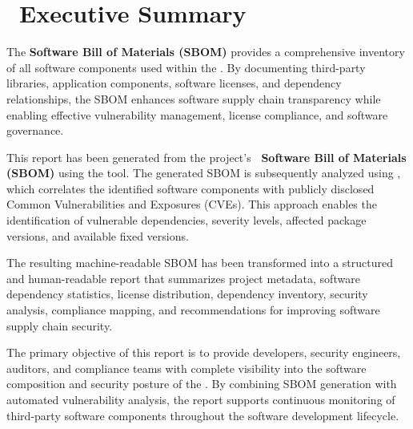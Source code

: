 
\chapter[Executive Summary]{\IconSummary\ Executive Summary}

The \textbf{Software Bill of Materials (SBOM)} provides a comprehensive inventory of all software components used within the \textbf{\ProjectName}. By documenting third-party libraries, application components, software licenses, and dependency relationships, the SBOM enhances software supply chain transparency while enabling effective vulnerability management, license compliance, and software governance.

This report has been generated from the project's \textbf{\SbomFormat\ Software Bill of Materials (SBOM)} using the \textbf{\SbomGenerator} tool. The generated SBOM is subsequently analyzed using \textbf{\VulScanner}, which correlates the identified software components with publicly disclosed Common Vulnerabilities and Exposures (CVEs). This approach enables the identification of vulnerable dependencies, severity levels, affected package versions, and available fixed versions.

The resulting machine-readable SBOM has been transformed into a structured and human-readable report that summarizes project metadata, software dependency statistics, license distribution, dependency inventory, security analysis, compliance mapping, and recommendations for improving software supply chain security.

The primary objective of this report is to provide developers, security engineers, auditors, and compliance teams with complete visibility into the software composition and security posture of the \textbf{\ProjectName}. By combining SBOM generation with automated vulnerability analysis, the report supports continuous monitoring of third-party software components throughout the software development lifecycle.

\vspace{0.4cm}


